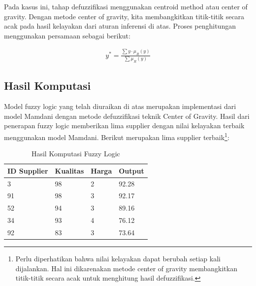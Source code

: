 \documentclass[titlepage]{article}
\begin{document}
            Pada kasus ini, tahap defuzzifikasi menggunakan centroid method atau center of gravity. Dengan metode center of gravity, kita membangkitkan titik-titik secara acak pada hasil kelayakan dari aturan inferensi di atas. Proses penghitungan menggunakan persamaan sebagai berikut:

            \begin{equation}
                \begin{split}
                    y^*= \frac{\sum y \cdot \mu_R(y)}{\sum \mu_R(y)}
                \end{split}
            \end{equation}

        \subsection{Hasil Komputasi}
            Model fuzzy logic yang telah diuraikan di atas merupakan implementasi dari model Mamdani dengan metode defuzzifikasi teknik Center of Gravity. Hasil dari penerapan fuzzy logic memberikan lima supplier dengan nilai kelayakan terbaik menggunakan model Mamdani. Berikut merupakan lima supplier terbaik\footnote{Perlu diperhatikan bahwa nilai kelayakan dapat berubah setiap kali dijalankan. Hal ini dikarenakan metode center of gravity membangkitkan titik-titik secara acak untuk menghitung hasil defuzzifikasi.}:

            \begin{table}[h!]
                \begin{center}
                    \begin{tabular}{@{}llll@{}}
                        \toprule
                        ID Supplier & Kualitas & Harga & Output \\ \midrule
                        3           & 98       & 2     & 92.28  \\
                        91          & 98       & 3     & 92.17  \\
                        52          & 94       & 3     & 89.16  \\
                        34          & 93       & 4     & 76.12  \\
                        92          & 83       & 3     & 73.64  \\ \bottomrule
                    \end{tabular}
                \end{center}
                \caption{Hasil Komputasi Fuzzy Logic}
                \label{tab:Hasil Komputasi}
            \end{table}
\end{document}
